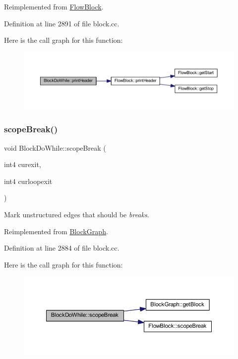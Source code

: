 Reimplemented from \mbox{\hyperlink{class_flow_block_a0d19c5b80186cf289dfbe0ce9e3ce37a}{Flow\+Block}}.



Definition at line 2891 of file block.\+cc.

Here is the call graph for this function\+:
\nopagebreak
\begin{figure}[H]
\begin{center}
\leavevmode
\includegraphics[width=350pt]{class_block_do_while_a95baa39da580d08f36b507fefe61823f_cgraph}
\end{center}
\end{figure}
\mbox{\label{class_block_do_while_a6a6254c0020641ccffd791f6206461cc}} 
\subsubsection{\texorpdfstring{scopeBreak()}{scopeBreak()}}
{\footnotesize\ttfamily void Block\+Do\+While\+::scope\+Break (\begin{DoxyParamCaption}\item[{int4}]{curexit,  }\item[{int4}]{curloopexit }\end{DoxyParamCaption})\hspace{0.3cm}{\ttfamily [virtual]}}



Mark unstructured edges that should be {\itshape breaks}. 



Reimplemented from \mbox{\hyperlink{class_block_graph_a55618dfd49266bd4185d119f08e8b630}{Block\+Graph}}.



Definition at line 2884 of file block.\+cc.

Here is the call graph for this function\+:
\nopagebreak
\begin{figure}[H]
\begin{center}
\leavevmode
\includegraphics[width=350pt]{class_block_do_while_a6a6254c0020641ccffd791f6206461cc_cgraph}
\end{center}
\end{figure}


